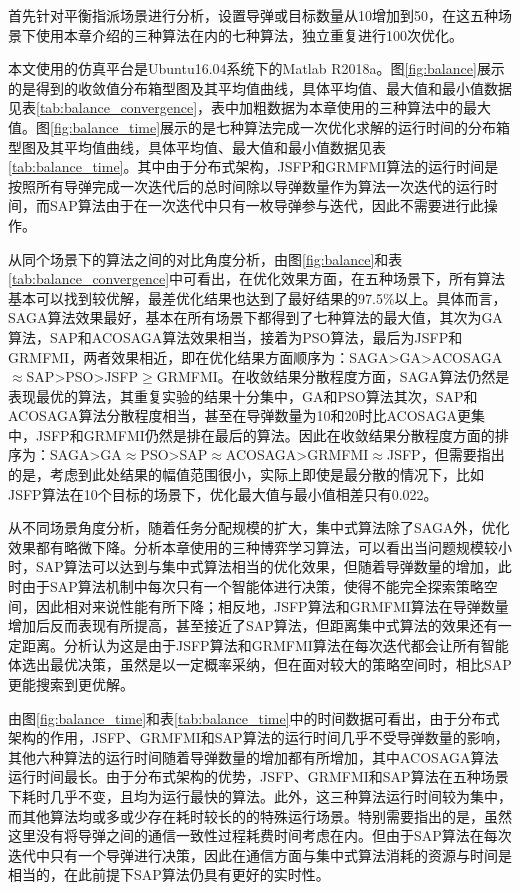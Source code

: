 首先针对平衡指派场景进行分析，设置导弹或目标数量从10增加到50，在这五种场景下使用本章介绍的三种算法在内的七种算法，独立重复进行100次优化。

本文使用的仿真平台是Ubuntu16.04系统下的Matlab R2018a。图\ref{fig:balance}展示的是得到的收敛值分布箱型图及其平均值曲线，具体平均值、最大值和最小值数据见表\ref{tab:balance_convergence}，表中加粗数据为本章使用的三种算法中的最大值。图\ref{fig:balance_time}展示的是七种算法完成一次优化求解的运行时间的分布箱型图及其平均值曲线，具体平均值、最大值和最小值数据见表\ref{tab:balance_time}。其中由于分布式架构，JSFP和GRMFMI算法的运行时间是按照所有导弹完成一次迭代后的总时间除以导弹数量作为算法一次迭代的运行时间，而SAP算法由于在一次迭代中只有一枚导弹参与迭代，因此不需要进行此操作。


从同个场景下的算法之间的对比角度分析，由图\ref{fig:balance}和表\ref{tab:balance_convergence}中可看出，在优化效果方面，在五种场景下，所有算法基本可以找到较优解，最差优化结果也达到了最好结果的97.5\%以上。具体而言，SAGA算法效果最好，基本在所有场景下都得到了七种算法的最大值，其次为GA算法，SAP和ACOSAGA算法效果相当，接着为PSO算法，最后为JSFP和GRMFMI，两者效果相近，即在优化结果方面顺序为：SAGA>GA>ACOSAGA$\approx$SAP>PSO>JSFP$\geq$GRMFMI。在收敛结果分散程度方面，SAGA算法仍然是表现最优的算法，其重复实验的结果十分集中，GA和PSO算法其次，SAP和ACOSAGA算法分散程度相当，甚至在导弹数量为10和20时比ACOSAGA更集中，JSFP和GRMFMI仍然是排在最后的算法。因此在收敛结果分散程度方面的排序为：SAGA>GA$\approx$PSO>SAP$\approx$ACOSAGA>GRMFMI$\approx$JSFP，但需要指出的是，考虑到此处结果的幅值范围很小，实际上即使是最分散的情况下，比如JSFP算法在10个目标的场景下，优化最大值与最小值相差只有0.022。

从不同场景角度分析，随着任务分配规模的扩大，集中式算法除了SAGA外，优化效果都有略微下降。分析本章使用的三种博弈学习算法，可以看出当问题规模较小时，SAP算法可以达到与集中式算法相当的优化效果，但随着导弹数量的增加，此时由于SAP算法机制中每次只有一个智能体进行决策，使得不能完全探索策略空间，因此相对来说性能有所下降；相反地，JSFP算法和GRMFMI算法在导弹数量增加后反而表现有所提高，甚至接近了SAP算法，但距离集中式算法的效果还有一定距离。分析认为这是由于JSFP算法和GRMFMI算法在每次迭代都会让所有智能体选出最优决策，虽然是以一定概率采纳，但在面对较大的策略空间时，相比SAP更能搜索到更优解。

由图\ref{fig:balance_time}和表\ref{tab:balance_time}中的时间数据可看出，由于分布式架构的作用，JSFP、GRMFMI和SAP算法的运行时间几乎不受导弹数量的影响，其他六种算法的运行时间随着导弹数量的增加都有所增加，其中ACOSAGA算法运行时间最长。由于分布式架构的优势，JSFP、GRMFMI和SAP算法在五种场景下耗时几乎不变，且均为运行最快的算法。此外，这三种算法运行时间较为集中，而其他算法均或多或少存在耗时较长的的特殊运行场景。特别需要指出的是，虽然这里没有将导弹之间的通信一致性过程耗费时间考虑在内。但由于SAP算法在每次迭代中只有一个导弹进行决策，因此在通信方面与集中式算法消耗的资源与时间是相当的，在此前提下SAP算法仍具有更好的实时性。

